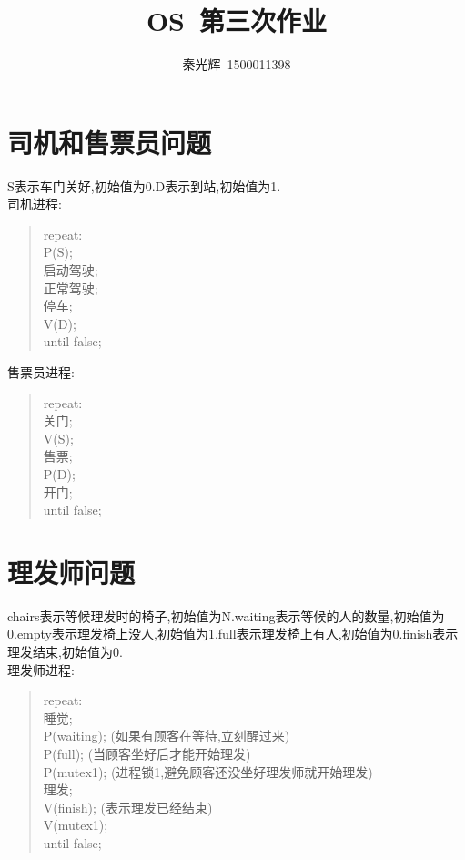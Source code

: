 \documentclass[a4paper,12pt,notitlepage]{article}
\begin{document}
\title{OS\ 第三次作业}
\author{秦光辉\ 1500011398}
\maketitle

\section{司机和售票员问题}

	S表示车门关好,初始值为0.D表示到站,初始值为1. \\

	司机进程: \\
	
\begin{quote}
	repeat:\\ 
		P(S); \\
		启动驾驶; \\
		正常驾驶; \\
		停车; \\
		V(D); \\
	until false;
\end{quote}

	售票员进程: \\
	
\begin{quote}
	repeat: \\
		关门; \\
		V(S); \\
		售票; \\
		P(D); \\
		开门; \\
	until false; 
\end{quote}

\section{理发师问题}

	chairs表示等候理发时的椅子,初始值为N.waiting表示等候的人的数量,初始值为0.empty表示理发椅上没人,初始值为1.full表示理发椅上有人,初始值为0.finish表示理发结束,初始值为0. \\
	
	理发师进程:

\begin{quote}
repeat: \\
	睡觉; \\
	P(waiting); (如果有顾客在等待,立刻醒过来) \\
	P(full); (当顾客坐好后才能开始理发) \\
	P(mutex1); (进程锁1,避免顾客还没坐好理发师就开始理发) \\
	理发; \\
	V(finish); (表示理发已经结束) \\
	V(mutex1); \\
until false;
\end{quote}
\end{document}
